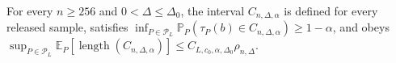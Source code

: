 For every \(n\geq256\) and \(0<\Delta\leq\Delta_0\), the interval \(C_{n,\Delta,\alpha}\) is defined for every released sample, satisfies \(\inf_{P\in\mathcal P_L}\mathbb P_P(\tau_P(b)\in C_{n,\Delta,\alpha})\geq1-\alpha\), and obeys \(\sup_{P\in\mathcal P_L}\mathbb E_P[\operatorname{length}(C_{n,\Delta,\alpha})]\leq C_{L,c_0,\alpha,\Delta_0}\rho_{n,\Delta}\).